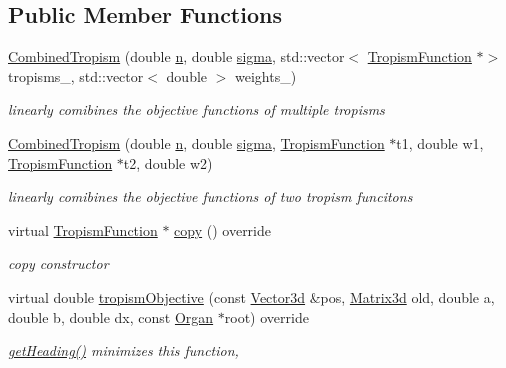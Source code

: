 \subsection*{Public Member Functions}
\begin{DoxyCompactItemize}
\item 
\mbox{\label{classCPlantBox_1_1CombinedTropism_ace109481909098acc9e430706368d0c5}} 
\hyperlink{classCPlantBox_1_1CombinedTropism_ace109481909098acc9e430706368d0c5}{Combined\+Tropism} (double \hyperlink{classCPlantBox_1_1TropismFunction_a619c74d63319c406730c95679784a04a}{n}, double \hyperlink{classCPlantBox_1_1TropismFunction_acdc5f9c3beda0a74ddadd591c5d8afaf}{sigma}, std\+::vector$<$ \hyperlink{classCPlantBox_1_1TropismFunction}{Tropism\+Function} $\ast$$>$ tropisms\+\_\+, std\+::vector$<$ double $>$ weights\+\_\+)
\begin{DoxyCompactList}\small\item\em linearly comibines the objective functions of multiple tropisms \end{DoxyCompactList}\item 
\hyperlink{classCPlantBox_1_1CombinedTropism_a5c02c15e17677871efaa7b8cfbc6c9b6}{Combined\+Tropism} (double \hyperlink{classCPlantBox_1_1TropismFunction_a619c74d63319c406730c95679784a04a}{n}, double \hyperlink{classCPlantBox_1_1TropismFunction_acdc5f9c3beda0a74ddadd591c5d8afaf}{sigma}, \hyperlink{classCPlantBox_1_1TropismFunction}{Tropism\+Function} $\ast$t1, double w1, \hyperlink{classCPlantBox_1_1TropismFunction}{Tropism\+Function} $\ast$t2, double w2)
\begin{DoxyCompactList}\small\item\em linearly comibines the objective functions of two tropism funcitons \end{DoxyCompactList}\item 
\mbox{\label{classCPlantBox_1_1CombinedTropism_a4fee2980c11652ac13d5652bdcd47d87}} 
virtual \hyperlink{classCPlantBox_1_1TropismFunction}{Tropism\+Function} $\ast$ \hyperlink{classCPlantBox_1_1CombinedTropism_a4fee2980c11652ac13d5652bdcd47d87}{copy} () override
\begin{DoxyCompactList}\small\item\em copy constructor \end{DoxyCompactList}\item 
virtual double \hyperlink{classCPlantBox_1_1CombinedTropism_a9ed761842ac79d92c15f9a88fc2df995}{tropism\+Objective} (const \hyperlink{classCPlantBox_1_1Vector3d}{Vector3d} \&pos, \hyperlink{classCPlantBox_1_1Matrix3d}{Matrix3d} old, double a, double b, double dx, const \hyperlink{classCPlantBox_1_1Organ}{Organ} $\ast$root) override
\begin{DoxyCompactList}\small\item\em \hyperlink{classCPlantBox_1_1TropismFunction_adb52b88734a94fe1365a00e02c7e6be5}{get\+Heading()} minimizes this function, \end{DoxyCompactList}\end{DoxyCompactItemize}
